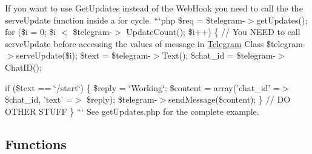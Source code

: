 If you want to use Get\-Updates instead of the Web\-Hook you need to call the the serve\-Update function inside a for cycle. ```php \$req = \$telegram-\/$>$get\-Updates(); for (\$i = 0; \$i $<$ \$telegram-\/$>$ Update\-Count(); \$i++) \{ // You N\-E\-E\-D to call serve\-Update before accessing the values of message in \hyperlink{class_telegram}{Telegram} Class \$telegram-\/$>$serve\-Update(\$i); \$text = \$telegram-\/$>$Text(); \$chat\-\_\-id = \$telegram-\/$>$Chat\-I\-D();

if (\$text == \char`\"{}/start\char`\"{}) \{ \$reply = \char`\"{}\-Working\char`\"{}; \$content = array('chat\-\_\-id' =$>$ \$chat\-\_\-id, 'text' =$>$ \$reply); \$telegram-\/$>$send\-Message(\$content); \} // D\-O O\-T\-H\-E\-R S\-T\-U\-F\-F \} ``` See get\-Updates.\-php for the complete example.

\subsection*{Functions }

